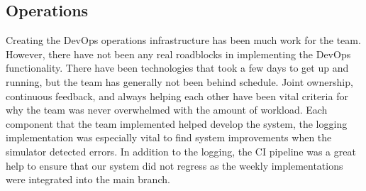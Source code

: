 \subsection{Operations}

Creating the DevOps operations infrastructure has been much work for the team. However, there have not been any real roadblocks in implementing the DevOps functionality. There have been technologies that took a few days to get up and running, but the team has generally not been behind schedule. Joint ownership, continuous feedback, and always helping each other have been vital criteria for why the team was never overwhelmed with the amount of workload. Each component that the team implemented helped develop the system, the logging implementation was especially vital to find system improvements when the simulator detected errors. In addition to the logging, the CI pipeline was a great help to ensure that our system did not regress as the weekly implementations were integrated into the main branch.